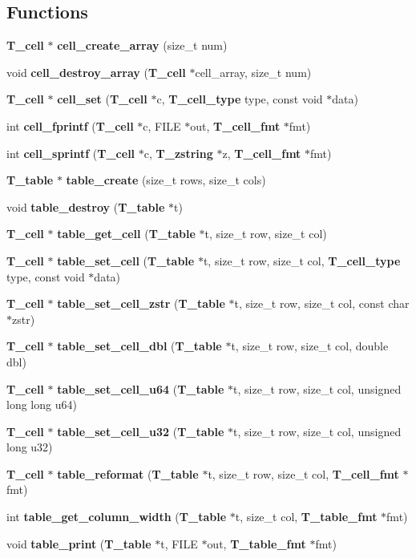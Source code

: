 \subsection*{Functions}
\begin{CompactItemize}
\item 
{\bf T\_\-cell} $\ast$ {\bf cell\_\-create\_\-array} (size\_\-t num)
\item 
void {\bf cell\_\-destroy\_\-array} ({\bf T\_\-cell} $\ast$cell\_\-array, size\_\-t num)
\item 
{\bf T\_\-cell} $\ast$ {\bf cell\_\-set} ({\bf T\_\-cell} $\ast$c, {\bf T\_\-cell\_\-type} type, const void $\ast$data)
\item 
int {\bf cell\_\-fprintf} ({\bf T\_\-cell} $\ast$c, FILE $\ast$out, {\bf T\_\-cell\_\-fmt} $\ast$fmt)
\item 
int {\bf cell\_\-sprintf} ({\bf T\_\-cell} $\ast$c, {\bf T\_\-zstring} $\ast$z, {\bf T\_\-cell\_\-fmt} $\ast$fmt)
\item 
{\bf T\_\-table} $\ast$ {\bf table\_\-create} (size\_\-t rows, size\_\-t cols)
\item 
void {\bf table\_\-destroy} ({\bf T\_\-table} $\ast$t)
\item 
{\bf T\_\-cell} $\ast$ {\bf table\_\-get\_\-cell} ({\bf T\_\-table} $\ast$t, size\_\-t row, size\_\-t col)
\item 
{\bf T\_\-cell} $\ast$ {\bf table\_\-set\_\-cell} ({\bf T\_\-table} $\ast$t, size\_\-t row, size\_\-t col, {\bf T\_\-cell\_\-type} type, const void $\ast$data)
\item 
{\bf T\_\-cell} $\ast$ {\bf table\_\-set\_\-cell\_\-zstr} ({\bf T\_\-table} $\ast$t, size\_\-t row, size\_\-t col, const char $\ast$zstr)
\item 
{\bf T\_\-cell} $\ast$ {\bf table\_\-set\_\-cell\_\-dbl} ({\bf T\_\-table} $\ast$t, size\_\-t row, size\_\-t col, double dbl)
\item 
{\bf T\_\-cell} $\ast$ {\bf table\_\-set\_\-cell\_\-u64} ({\bf T\_\-table} $\ast$t, size\_\-t row, size\_\-t col, unsigned long long u64)
\item 
{\bf T\_\-cell} $\ast$ {\bf table\_\-set\_\-cell\_\-u32} ({\bf T\_\-table} $\ast$t, size\_\-t row, size\_\-t col, unsigned long u32)
\item 
{\bf T\_\-cell} $\ast$ {\bf table\_\-reformat} ({\bf T\_\-table} $\ast$t, size\_\-t row, size\_\-t col, {\bf T\_\-cell\_\-fmt} $\ast$fmt)
\item 
int {\bf table\_\-get\_\-column\_\-width} ({\bf T\_\-table} $\ast$t, size\_\-t col, {\bf T\_\-table\_\-fmt} $\ast$fmt)
\item 
void {\bf table\_\-print} ({\bf T\_\-table} $\ast$t, FILE $\ast$out, {\bf T\_\-table\_\-fmt} $\ast$fmt)
\end{CompactItemize}
